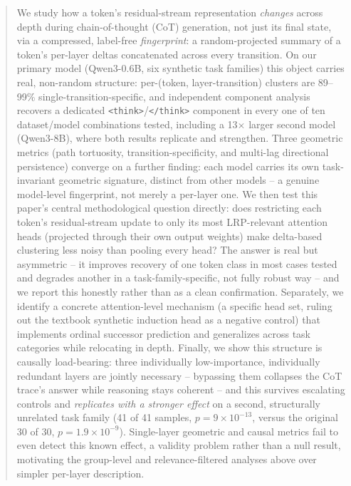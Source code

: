 \documentclass{article}
\theoremstyle{plain}
\theoremstyle{definition}
\theoremstyle{remark}
\begin{document}
\begin{abstract}
We study how a token's residual-stream representation \emph{changes} across depth
during chain-of-thought (CoT) generation, not just its final state, via a compressed,
label-free \emph{fingerprint}: a random-projected summary of a token's per-layer deltas
concatenated across every transition. On our primary model (Qwen3-0.6B, six synthetic
task families) this object carries real, non-random structure: per-(token,
layer-transition) clusters are 89--99\% single-transition-specific, and independent
component analysis recovers a dedicated \texttt{<think>}/\texttt{</think>} component in
every one of ten dataset/model combinations tested, including a 13$\times$ larger
second model (Qwen3-8B), where both results replicate and strengthen. Three geometric
metrics (path tortuosity, transition-specificity, and multi-lag directional persistence)
converge on a further finding: each model carries its own task-invariant geometric
signature, distinct from other models -- a genuine model-level fingerprint, not merely a
per-layer one. We then test this paper's central methodological question directly: does
restricting each token's residual-stream update to only its most LRP-relevant attention
heads (projected through their own output weights) make delta-based clustering less
noisy than pooling every head? The answer is real but asymmetric -- it improves recovery
of one token class in most cases tested and degrades another in a task-family-specific,
not fully robust way -- and we report this honestly rather than as a clean confirmation.
Separately, we identify a concrete attention-level mechanism (a specific head set, ruling
out the textbook synthetic induction head as a negative control) that implements ordinal
successor prediction and generalizes across task categories while relocating in depth.
Finally, we show this structure is causally load-bearing: three individually
low-importance, individually redundant layers are jointly necessary -- bypassing them
collapses the CoT trace's answer while reasoning stays coherent -- and this survives
escalating controls and \emph{replicates with a stronger effect} on a second,
structurally unrelated task family (41 of 41 samples, $p=9\times10^{-13}$, versus the
original 30 of 30, $p=1.9\times10^{-9}$). Single-layer geometric and causal metrics fail
to even detect this known effect, a validity problem rather than a null result,
motivating the group-level and relevance-filtered analyses above over simpler per-layer
description.
\end{abstract}
\end{document}
